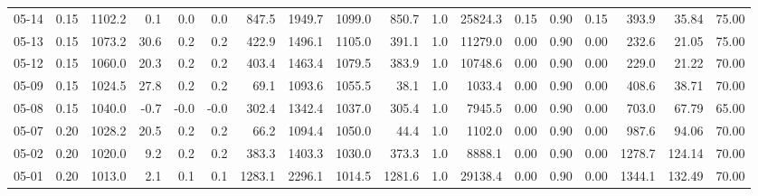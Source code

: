 \begin{threeparttable}
{\begin{tabular}{lrrrrrrrrrrrrrrrrr}
  05-14 &     0.15 & 1102.2 &               0.1 &               0.0 &                0.0 &              847.5 & 1949.7 & 1099.0 &      850.7 &                      1.0 &             25824.3 &       0.15 &      0.90 &           0.15 &            393.9 &           35.84 &                  75.00 \\
  05-13 &     0.15 & 1073.2 &              30.6 &               0.2 &                0.2 &              422.9 & 1496.1 & 1105.0 &      391.1 &                      1.0 &             11279.0 &       0.00 &      0.90 &           0.00 &            232.6 &           21.05 &                  75.00 \\
  05-12 &     0.15 & 1060.0 &              20.3 &               0.2 &                0.2 &              403.4 & 1463.4 & 1079.5 &      383.9 &                      1.0 &             10748.6 &       0.00 &      0.90 &           0.00 &            229.0 &           21.22 &                  70.00 \\
  05-09 &     0.15 & 1024.5 &              27.8 &               0.2 &                0.2 &               69.1 & 1093.6 & 1055.5 &       38.1 &                      1.0 &              1033.4 &       0.00 &      0.90 &           0.00 &            408.6 &           38.71 &                  70.00 \\
  05-08 &     0.15 & 1040.0 &              -0.7 &              -0.0 &               -0.0 &              302.4 & 1342.4 & 1037.0 &      305.4 &                      1.0 &              7945.5 &       0.00 &      0.90 &           0.00 &            703.0 &           67.79 &                  65.00 \\
  05-07 &     0.20 & 1028.2 &              20.5 &               0.2 &                0.2 &               66.2 & 1094.4 & 1050.0 &       44.4 &                      1.0 &              1102.0 &       0.00 &      0.90 &           0.00 &            987.6 &           94.06 &                  70.00 \\
  05-02 &     0.20 & 1020.0 &               9.2 &               0.2 &                0.2 &              383.3 & 1403.3 & 1030.0 &      373.3 &                      1.0 &              8888.1 &       0.00 &      0.90 &           0.00 &           1278.7 &          124.14 &                  70.00 \\
  05-01 &     0.20 & 1013.0 &               2.1 &               0.1 &                0.1 &             1283.1 & 2296.1 & 1014.5 &     1281.6 &                      1.0 &             29138.4 &       0.00 &      0.90 &           0.00 &           1344.1 &          132.49 &                  70.00 \\

\end{tabular}}
\end{threeparttable}
